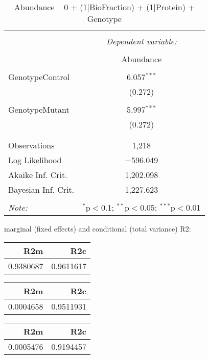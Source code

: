 \documentclass[11pt]{report}
\begin{document}
\begin{table}[!htbp] \centering 
  \caption{Abundance ~ 0 + (1|BioFraction) + (1|Protein) + Genotype} 
  \label{} 
\begin{tabular}{@{\extracolsep{5pt}}lc} 
\\[-1.8ex]\hline 
\hline \\[-1.8ex] 
 & \multicolumn{1}{c}{\textit{Dependent variable:}} \\ 
\cline{2-2} 
\\[-1.8ex] & Abundance \\ 
\hline \\[-1.8ex] 
 GenotypeControl & 6.057$^{***}$ \\ 
  & (0.272) \\ 
  & \\ 
 GenotypeMutant & 5.997$^{***}$ \\ 
  & (0.272) \\ 
  & \\ 
\hline \\[-1.8ex] 
Observations & 1,218 \\ 
Log Likelihood & $-$596.049 \\ 
Akaike Inf. Crit. & 1,202.098 \\ 
Bayesian Inf. Crit. & 1,227.623 \\ 
\hline 
\hline \\[-1.8ex] 
\textit{Note:}  & \multicolumn{1}{r}{$^{*}$p$<$0.1; $^{**}$p$<$0.05; $^{***}$p$<$0.01} \\ 
\end{tabular} 
\end{table} 
marginal (fixed effects) and conditional (total variance) R2:

\begin{tabular}{r|r}
\hline
R2m & R2c\\
\hline
0.9380687 & 0.9611617\\
\hline
\end{tabular}

\begin{tabular}{r|r}
\hline
R2m & R2c\\
\hline
0.0004658 & 0.9511931\\
\hline
\end{tabular}

\begin{tabular}{r|r}
\hline
R2m & R2c\\
\hline
0.0005476 & 0.9194457\\
\hline
\end{tabular}
\end{document}
